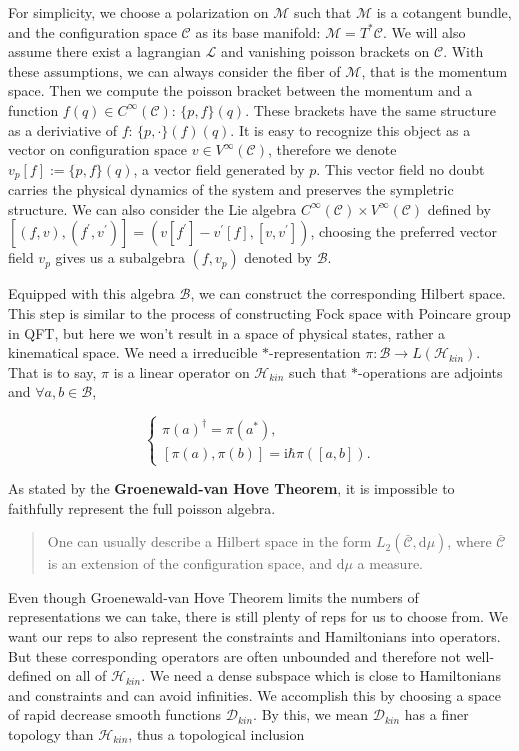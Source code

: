 \documentclass{article}
\begin{document}
For simplicity, we choose a polarization on $\mathcal{M}$ such that $\mathcal{M}$ is a cotangent bundle, and the configuration space $\mathcal{C}$ as its base manifold: $\mathcal{M} = T^\ast \mathcal{C}$. We will also assume there exist a lagrangian $\mathcal{L}$ and vanishing poisson brackets on $\mathcal{C}$. With these assumptions, we can always consider the fiber of $\mathcal{M}$, that is the momentum space. Then we compute the poisson bracket between the momentum and a function $f(q) \in C^\infty(\mathcal{C})$: $\{p,f\}(q)$. These brackets have the same structure as a deriviative of $f$: $\{p,\cdot\}(f)(q)$. It is easy to recognize this object as a vector on configuration space $v\in V^\infty(\mathcal{C})$, therefore we denote $v_p[f] := \{p,f\}(q)$, a vector field generated by $p$. This vector field no doubt carries the physical dynamics of the system and preserves the sympletric structure. We can also consider the Lie algebra $C^\infty(\mathcal{C})\times V^\infty(\mathcal{C})$ defined by $[(f,v),(f^\prime,v^\prime)] = (v[f^\prime] - v^\prime[f], [v,v^\prime])$, choosing the preferred vector field $v_p$ gives us a subalgebra $(f, v_p)$ denoted by $\mathcal{B}$.

Equipped with this algebra $\mathcal{B}$, we can construct the corresponding Hilbert space. This step is similar to the process of constructing Fock space with Poincare group in QFT, but here we won't result in a space of physical states, rather a kinematical space.
We need a irreducible $*$-representation $\pi:\mathcal{B}\to L(\mathcal{H}_{kin})$. That is to say, $\pi$ is a linear operator on $\mathcal{H}_{kin}$ such that $*$-operations are adjoints and $\forall a,b\in \mathcal{B}$,

$$
\begin{cases}
    \pi(a)^\dagger = \pi(a^\ast),\\
    [\pi(a),\pi(b)] = \mathrm{i}\hbar\pi([a,b]).
\end{cases}
$$

As stated by the \textbf{Groenewald-van Hove Theorem}, it is impossible to faithfully represent the full poisson algebra.

\begin{quote}
One can usually describe a Hilbert space in the form $L_2(\bar{\mathcal{C}},\mathrm{d}\mu)$, where $\bar{\mathcal{C}}$ is an extension of the configuration space, and $\mathrm{d}\mu$ a measure.
\end{quote}

Even though Groenewald-van Hove Theorem limits the numbers of representations we can take, there is still plenty of reps for us to choose from. We want our reps to also represent the constraints and Hamiltonians into operators. But these corresponding operators are often unbounded and therefore not well-defined on all of $\mathcal{H}_{kin}$. We need a dense subspace which is close to Hamiltonians and constraints and can avoid infinities. We accomplish this by choosing a space of rapid decrease smooth functions $\mathcal{D}_{kin}$. By this, we mean $\mathcal{D}_{kin}$ has a finer topology than $\mathcal{H}_{kin}$, thus a topological inclusion
\end{document}
